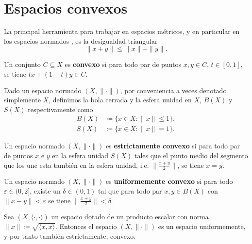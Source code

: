 \section{Espacios convexos}

La principal herramienta para trabajar en espacios métricos, y en particular en los espacios normados \cite{babb}, es la desigualdad triangular 
\begin{equation}
    \| x + y \| \leq \| x \| + \| y \|.
\end{equation}

\begin{definition}
    Un conjunto $ C \subseteq X $ es {\bf convexo} si para todo par de puntos $ x, y \in C $, $ t \in [0, 1] $, se tiene $ tx + (1-t)y \in C $.
\end{definition}

Dado un espacio normado $ (X, \| \cdot \|) $, por conveniencia a veces denotado simplemente $ X $, definimos la bola cerrada y la esfera unidad en $ X $, $ B(X) $ y $ S(X) $ respectivamente como
\begin{equation}
\begin{split}
    B(X) &\coloneq \{x \in X \colon \| x \| \leq 1 \}, \\
    S(X) &\coloneq \{x \in X \colon \| x \| = 1 \}.
\end{split}
\end{equation}

\begin{definition}
    Un espacio normado $ (X, \| \cdot \|) $ es {\bf estrictamente convexo} si para todo par de puntos $ x $ e $ y $ en la esfera unidad $ S(X) $ tales que el punto medio del segmento que los une esta también en la esfera unidad, i.e. $\| \frac{x+y}{2}\| $, se tiene $ x = y $.
\end{definition}

\begin{definition}
    Un espacio normado $ (X, \| \cdot \|) $ es {\bf uniformemente convexo} si para todo $ \varepsilon \in (0, 2] $, existe un $ \delta \in (0, 1) $ tal que para todo par $ x, y \in B(X) $ con $ \| x - y \| < \varepsilon $ se tiene $ \| \frac{x+y}{2} \| < \delta $.
\end{definition}

\begin{proposition} \label{prop:hilbert-convex}
    Sea $ (X, \langle \cdot, \cdot \rangle) $ un espacio dotado de un producto escalar con norma $ \|x\| \coloneq \sqrt{\langle x, x \rangle} $. Entonces el espacio $ (X, \|\cdot\|) $ es un espacio uniformemente, y por tanto también estrictamente, convexo. 
\end{proposition}


